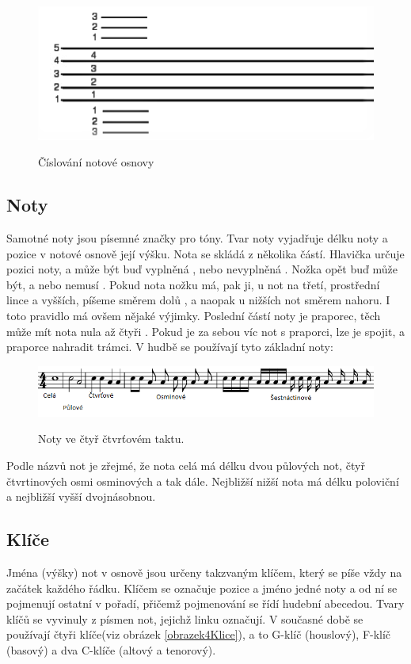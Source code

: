 \begin{figure}[h]\centering
    \centering
    \includegraphics[width=0.5\linewidth]{obrazky/notovaOsnova.png}\\[1pt]  
    \caption{Číslování notové osnovy}    
    \label{obrazekNotovaOsnova}
\end{figure}

\subsection{Noty}
Samotné noty jsou písemné značky pro tóny.
Tvar noty vyjadřuje délku noty a pozice v notové osnově její výšku.
Nota se skládá z několika částí.
Hlavička určuje pozici noty, a může být buď vyplněná , nebo nevyplněná . 
Nožka opět buď může být, a nebo nemusí . 
Pokud nota nožku má, pak ji, u not na třetí, prostřední lince a vyšších, píšeme směrem dolů ,
a naopak u nižších not směrem nahoru.
I toto pravidlo má ovšem nějaké výjimky.
Poslední částí noty je praporec, těch může mít nota nula až čtyři .
Pokud je za sebou víc not s praporci, lze je spojit, a praporce nahradit trámci.
V hudbě se používají tyto základní noty:

\begin{figure}[h]\centering
    \centering
    \includegraphics[width=0.8\linewidth]{obrazky/druhyNot.png}\\[1pt]  
    \caption{Noty ve čtyř čtvrťovém taktu.}    
    \label{obrazekNoty}
\end{figure}

Podle názvů not je zřejmé, že nota celá má délku dvou půlových not, 
čtyř čtvrtinových osmi osminových a tak dále.
Nejbližší nižší nota má délku poloviční a nejbližší vyšší dvojnásobnou.
\par

\subsection{Klíče}
Jména (výšky) not v osnově jsou určeny takzvaným klíčem, 
který se píše vždy na začátek každého řádku.
Klíčem se označuje pozice a jméno jedné noty 
a od ní se pojmenují ostatní v pořadí, 
přičemž pojmenování se řídí hudební abecedou.
Tvary klíčů se vyvinuly z písmen not, jejichž linku označují.
V současné době se používají čtyři klíče(viz obrázek \ref{obrazek4Klice}), 
a to G-klíč (houslový), F-klíč (basový) a dva C-klíče (altový a tenorový).

